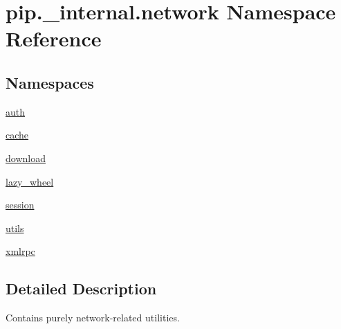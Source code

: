 \hypertarget{namespacepip_1_1__internal_1_1network}{}\section{pip.\+\_\+internal.\+network Namespace Reference}
\label{namespacepip_1_1__internal_1_1network}
\subsection*{Namespaces}
\begin{DoxyCompactItemize}
\item 
 \hyperlink{namespacepip_1_1__internal_1_1network_1_1auth}{auth}
\item 
 \hyperlink{namespacepip_1_1__internal_1_1network_1_1cache}{cache}
\item 
 \hyperlink{namespacepip_1_1__internal_1_1network_1_1download}{download}
\item 
 \hyperlink{namespacepip_1_1__internal_1_1network_1_1lazy__wheel}{lazy\+\_\+wheel}
\item 
 \hyperlink{namespacepip_1_1__internal_1_1network_1_1session}{session}
\item 
 \hyperlink{namespacepip_1_1__internal_1_1network_1_1utils}{utils}
\item 
 \hyperlink{namespacepip_1_1__internal_1_1network_1_1xmlrpc}{xmlrpc}
\end{DoxyCompactItemize}


\subsection{Detailed Description}
\begin{DoxyVerb}Contains purely network-related utilities.
\end{DoxyVerb}
 